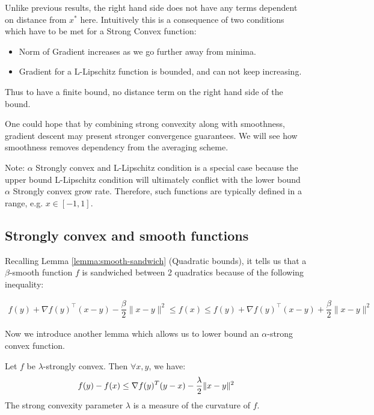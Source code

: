 \documentclass{article}
\DeclarePairedDelimiter{\norm}{\lVert}{\rVert}
\begin{document}
\vspace{3mm}
Unlike previous results, the right hand side does not have any terms dependent on distance from $x^{*}$ here. Intuitively this is a consequence of two conditions which have to be met for a Strong Convex function:
\begin{itemize}
    \item Norm of Gradient increases as we go further away from minima.
    \item Gradient for a L-Lipschitz function is bounded, and can not keep increasing.
\end{itemize}
Thus to have a finite bound, no distance term on the right hand side of the bound.
\vspace{3mm}

One could hope that by combining strong convexity along with smoothness, gradient descent may present stronger convergence guarantees. We will see how smoothness removes dependency from the averaging scheme.

\vspace{3mm}
Note: $\alpha $ Strongly convex and L-Lipschitz condition is a special case because the upper bound L-Lipschitz condition will ultimately conflict with the lower bound $\alpha $ Strongly convex grow rate. Therefore, such functions are typically defined in a range, e.g. $x \in [-1,1]$.

\subsection{Strongly convex and smooth functions}

Recalling Lemma \ref{lemma:smooth-sandwich} (Quadratic bounds), it tells us that a $\beta$-smooth function $f$ is sandwiched between 2 quadratics because of the following inequality:

\begin{align}\label{eq:smooth-bound}
f(y) + \nabla f(y)^\intercal (x-y) - \dfrac{\beta}{2} \| x-y\|^2 \leq f(x) \leq f(y) + \nabla f(y)^\intercal (x-y) + \dfrac{\beta}{2} \| x-y\|^2
\end{align}
 


Now we introduce another lemma which allows us to lower bound an $\alpha$-strong convex function.

\begin{lemma}\label{lemma:str-cvx-bound}
Let $f$ be $\lambda$-strongly convex. Then $\forall x, y$, we have:
\begin{align*}
f(y) - f(x) \leq \nabla f(y)^T(y-x) - \frac{\lambda}{2} \norm{x - y}^2
\end{align*}
The strong convexity parameter $\lambda$ is a measure of the curvature of $f$.
\end{lemma}
\end{document}

